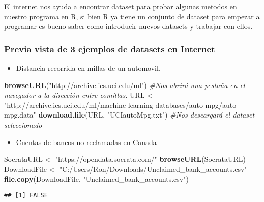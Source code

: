 \documentclass[]{article}
\newenvironment{Shaded}{\begin{snugshade}}{\end{snugshade}}
\newcommand{\CommentTok}[1]{\textcolor[rgb]{0.56,0.35,0.01}{\textit{#1}}}
\newcommand{\KeywordTok}[1]{\textcolor[rgb]{0.13,0.29,0.53}{\textbf{#1}}}
\newcommand{\NormalTok}[1]{#1}
\newcommand{\StringTok}[1]{\textcolor[rgb]{0.31,0.60,0.02}{#1}}
\providecommand{\tightlist}{%
  \setlength{\itemsep}{0pt}\setlength{\parskip}{0pt}}
\begin{document}
El internet nos ayuda a encontrar dataset para probar algunas metodos en
nuestro programa en R, si bien R ya tiene un conjunto de dataset para
empezar a programar es bueno saber como introducir nuevos datasets y
trabajar con ellos.

\hypertarget{previa-vista-de-3-ejemplos-de-datasets-en-internet}{%
\subsubsection{Previa vista de 3 ejemplos de datasets en
Internet}\label{previa-vista-de-3-ejemplos-de-datasets-en-internet}}

\begin{itemize}
\tightlist
\item
  Distancia recorrida en millas de un automovil.
\end{itemize}

\begin{Shaded}
\begin{Highlighting}[]
\KeywordTok{browseURL}\NormalTok{(}\StringTok{"http://archive.ics.uci.edu/ml"}\NormalTok{) }\CommentTok{#Nos abrirá una pestaña en el navegador a la dirección entre comillas.}
\NormalTok{URL <-}\StringTok{ "http://archive.ics.uci.edu/ml/machine-learning-databases/auto-mpg/auto-mpg.data"}
\KeywordTok{download.file}\NormalTok{(URL, }\StringTok{"UCIautoMpg.txt"}\NormalTok{) }\CommentTok{#Nos descargará el dataset seleccionado}
\end{Highlighting}
\end{Shaded}

\begin{itemize}
\tightlist
\item
  Cuentas de bancos no reclamadas en Canada
\end{itemize}

\begin{Shaded}
\begin{Highlighting}[]
\NormalTok{SocrataURL <-}\StringTok{ "https://opendata.socrata.com/"}
\KeywordTok{browseURL}\NormalTok{(SocrataURL)}
\NormalTok{DownloadFile <-}\StringTok{ "C:/Users/Ron/Downloads/Unclaimed_bank_accounts.csv"}
\KeywordTok{file.copy}\NormalTok{(DownloadFile, }\StringTok{"Unclaimed_bank_accounts.csv"}\NormalTok{)}
\end{Highlighting}
\end{Shaded}

\begin{verbatim}
## [1] FALSE
\end{verbatim}
\end{document}
